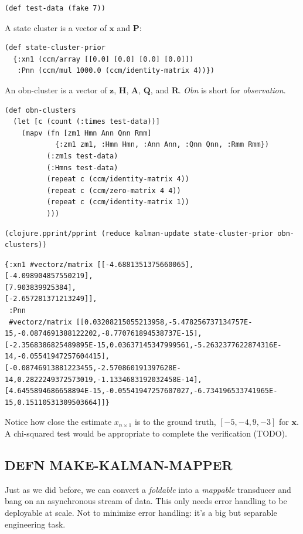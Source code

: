 \documentclass[10pt,oneside,x11names]{article}
\begin{document}
\begin{verbatim}
(def test-data (fake 7))
\end{verbatim}

A state cluster is a vector of \(\boldsymbol{x}\) and \(\boldsymbol{P}\):

\begin{verbatim}
(def state-cluster-prior
  {:xn1 (ccm/array [[0.0] [0.0] [0.0] [0.0]])
   :Pnn (ccm/mul 1000.0 (ccm/identity-matrix 4))})
\end{verbatim}

An obn-cluster is a vector of \(\boldsymbol{z}\), \(\boldsymbol{H}\),
\(\boldsymbol{A}\), \(\boldsymbol{Q}\), and \(\boldsymbol{R}\). \emph{Obn} is short
for \emph{observation}.

\begin{verbatim}
(def obn-clusters
  (let [c (count (:times test-data))]
    (mapv (fn [zm1 Hmn Ann Qnn Rmm]
            {:zm1 zm1, :Hmn Hmn, :Ann Ann, :Qnn Qnn, :Rmm Rmm})
          (:zm1s test-data)
          (:Hmns test-data)
          (repeat c (ccm/identity-matrix 4))
          (repeat c (ccm/zero-matrix 4 4))
          (repeat c (ccm/identity-matrix 1))
          )))
\end{verbatim}

\begin{verbatim}
(clojure.pprint/pprint (reduce kalman-update state-cluster-prior obn-clusters))
\end{verbatim}

\begin{verbatim}
{:xn1 #vectorz/matrix [[-4.6881351375660065],
[-4.098904857550219],
[7.903839925384],
[-2.657281371213249]],
 :Pnn
 #vectorz/matrix [[0.03208215055213958,-5.478256737134757E-15,-0.0874691388122202,-8.770761894538737E-15],
[-2.3568386825489895E-15,0.03637145347999561,-5.2632377622874316E-14,-0.05541947257604415],
[-0.08746913881223455,-2.570860191397628E-14,0.2822249372573019,-1.1334683192032458E-14],
[4.6455894686658894E-15,-0.05541947257607027,-6.734196533741965E-15,0.15110531309503664]]}
\end{verbatim}


Notice how close the estimate \(x_{n\times{1}}\) is to the ground truth, \([-5, -4,
9, -3]\) for \(\boldsymbol{x}\). A chi-squared test would be appropriate to
complete the verification (TODO).

\subsection{DEFN MAKE-KALMAN-MAPPER}
\label{make-kalman-mapper}
Just as we did before, we can convert a \emph{foldable} into a \emph{mappable}
transducer and bang on an asynchronous stream of data. This only needs
error handling to be deployable at scale. Not to minimize error
handling: it's a big but separable engineering task.
\end{document}
